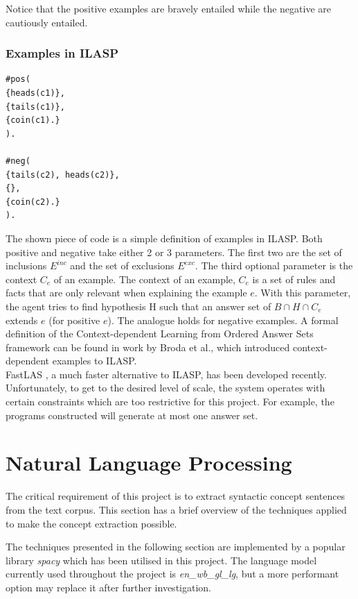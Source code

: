 Notice that the positive examples are bravely entailed while the negative are cautiously entailed.\\

\subsubsection{Examples in ILASP}

\begin{verbatim}
#pos(
{heads(c1)},
{tails(c1)},
{coin(c1).}
).

#neg(
{tails(c2), heads(c2)},
{},
{coin(c2).}
).
\end{verbatim}

The shown piece of code is a simple definition of examples in ILASP. 
Both positive and negative take either 2 or 3 parameters. The first two are the set of inclusions $E^{inc}$ and the set of exclusions $E^{exc}$.
The third optional parameter is the context $C_e$ of an example.
The context of an example, $C_e$ is a set of rules and facts that are only relevant when explaining the example $e$.
With this parameter, the agent tries to find hypothesis H such that an answer set of $B \cap H \cap C_e$ extends $e$ (for positive $e$).
The analogue holds for negative examples. 
A formal definition of the Context-dependent Learning from Ordered Answer Sets framework can be found in work by Broda et al., \cite{RefWorks:RefID:56-broda2016iterative} which introduced context-dependent examples to ILASP. \\

FastLAS \cite{RefWorks:RefID:19-law2020fastlas:}, a much faster alternative to ILASP, has been developed recently.
Unfortunately, to get to the desired level of scale, the system operates with certain constraints which are too restrictive for this project.
For example, the programs constructed will generate at most one answer set.


\section{Natural Language Processing}

The critical requirement of this project is to extract syntactic concept sentences from the text corpus.
This section has a brief overview of the techniques applied to make the concept extraction possible.

The techniques presented in the following section are implemented by a popular library \emph{spacy} \cite{RefWorks:RefID:24-spacy} which has been utilised in this project. 
The language model currently used throughout the project is \emph{en\_wb\_gl\_lg}, but a more performant option may replace it after further investigation.

